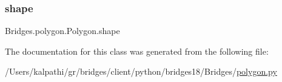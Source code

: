 \subsubsection{\texorpdfstring{shape}{shape}}
{\footnotesize\ttfamily Bridges.\+polygon.\+Polygon.\+shape}



The documentation for this class was generated from the following file\+:\begin{DoxyCompactItemize}
\item 
/\+Users/kalpathi/gr/bridges/client/python/bridges18/\+Bridges/\mbox{\hyperlink{polygon_8py}{polygon.\+py}}\end{DoxyCompactItemize}
